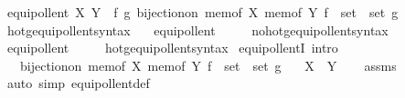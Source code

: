 \begin{isabellebody}
\begin{isamarkuptext}
\end{isamarkuptext}\isamarkuptrue%
\isamarkupfalse%
\ {\isachardoublequoteopen}equipollent\ X\ Y\ {\isasymequiv}\ {\isasymexists}f\ g{\isachardot}{\kern0pt}\ bijection{\isacharunderscore}{\kern0pt}on\ {\isacharparenleft}{\kern0pt}mem{\isacharunderscore}{\kern0pt}of\ X{\isacharparenright}{\kern0pt}\ {\isacharparenleft}{\kern0pt}mem{\isacharunderscore}{\kern0pt}of\ Y{\isacharparenright}{\kern0pt}\ {\isacharparenleft}{\kern0pt}f\ {\isacharcolon}{\kern0pt}{\isacharcolon}{\kern0pt}\ set\ {\isasymRightarrow}\ set{\isacharparenright}{\kern0pt}\ g{\isachardoublequoteclose}\isanewline
\isanewline
{}\isamarkupfalse%
\ hotg{\isacharunderscore}{\kern0pt}equipollent{\isacharunderscore}{\kern0pt}syntax\ \ \isamarkupfalse%
\ equipollent\ {\isacharparenleft}{\kern0pt}\ {\isachardoublequoteopen}{\isasymapprox}{\isachardoublequoteclose}\ {}{}{\isacharparenright}{\kern0pt}\ \isamarkupfalse%
\isanewline
{}\isamarkupfalse%
\ no{\isacharunderscore}{\kern0pt}hotg{\isacharunderscore}{\kern0pt}equipollent{\isacharunderscore}{\kern0pt}syntax\ \ \isamarkupfalse%
\ equipollent\ {\isacharparenleft}{\kern0pt}\ {\isachardoublequoteopen}{\isasymapprox}{\isachardoublequoteclose}\ {}{}{\isacharparenright}{\kern0pt}\ \isamarkupfalse%
\isanewline
{}\isamarkupfalse%
\ hotg{\isacharunderscore}{\kern0pt}equipollent{\isacharunderscore}{\kern0pt}syntax\isanewline
\isanewline
{}\isamarkupfalse%
\ equipollentI\ {\isacharbrackleft}{\kern0pt}intro{\isacharbrackright}{\kern0pt}{\isacharcolon}{\kern0pt}\isanewline
\ \ \ {\isachardoublequoteopen}bijection{\isacharunderscore}{\kern0pt}on\ {\isacharparenleft}{\kern0pt}mem{\isacharunderscore}{\kern0pt}of\ X{\isacharparenright}{\kern0pt}\ {\isacharparenleft}{\kern0pt}mem{\isacharunderscore}{\kern0pt}of\ Y{\isacharparenright}{\kern0pt}\ {\isacharparenleft}{\kern0pt}f\ {\isacharcolon}{\kern0pt}{\isacharcolon}{\kern0pt}\ set\ {\isasymRightarrow}\ set{\isacharparenright}{\kern0pt}\ g{\isachardoublequoteclose}\isanewline
\ \ \ {\isachardoublequoteopen}X\ {\isasymapprox}\ Y{\isachardoublequoteclose}\isanewline
%
\isadelimproof
\ \ %
\endisadelimproof
%
\isatagproof
{}\isamarkupfalse%
\ assms\ \isamarkupfalse%
\ {\isacharparenleft}{\kern0pt}auto\ simp{\isacharcolon}{\kern0pt}\ equipollent{\isacharunderscore}{\kern0pt}def{\isacharparenright}{\kern0pt}%

\end{isabellebody}
